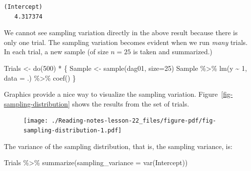 \documentclass[
  letterpaper,
  DIV=11,
  numbers=noendperiod,
  oneside]{scrreprt}
\newenvironment{Shaded}{\begin{snugshade}}{\end{snugshade}}
\newcommand{\AttributeTok}[1]{\textcolor[rgb]{0.40,0.45,0.13}{#1}}
\newcommand{\DecValTok}[1]{\textcolor[rgb]{0.68,0.00,0.00}{#1}}
\newcommand{\FunctionTok}[1]{\textcolor[rgb]{0.28,0.35,0.67}{#1}}
\newcommand{\NormalTok}[1]{\textcolor[rgb]{0.00,0.23,0.31}{#1}}
\newcommand{\OtherTok}[1]{\textcolor[rgb]{0.00,0.23,0.31}{#1}}
\newcommand{\SpecialCharTok}[1]{\textcolor[rgb]{0.37,0.37,0.37}{#1}}
\begin{document}
\begin{verbatim}
(Intercept) 
   4.317374 
\end{verbatim}

We cannot see sampling variation directly in the above result because
there is only one trial. The sampling variation becomes evident when we
run \emph{many} trials. In each trial, a new sample (of size \(n=25\) is
taken and summarized.)

\begin{Shaded}
\begin{Highlighting}[]
\NormalTok{Trials }\OtherTok{\textless{}{-}} \FunctionTok{do}\NormalTok{(}\DecValTok{500}\NormalTok{) }\SpecialCharTok{*}\NormalTok{ \{}
\NormalTok{  Sample }\OtherTok{\textless{}{-}} \FunctionTok{sample}\NormalTok{(dag01, }\AttributeTok{size=}\DecValTok{25}\NormalTok{) }
\NormalTok{  Sample }\SpecialCharTok{\%\textgreater{}\%} 
    \FunctionTok{lm}\NormalTok{(y }\SpecialCharTok{\textasciitilde{}} \DecValTok{1}\NormalTok{, }\AttributeTok{data =}\NormalTok{ .) }\SpecialCharTok{\%\textgreater{}\%}
    \FunctionTok{coef}\NormalTok{()}
\NormalTok{\}}
\end{Highlighting}
\end{Shaded}

Graphics provide a nice way to visualize the sampling variation.
Figure~\ref{fig-sampling-distribution} shows the results from the set of
trials.

\begin{figure}


{\centering \texttt{[image: ./Reading-notes-lesson-22\_files/figure-pdf/fig-sampling-distribution-1.pdf]}

}

\end{figure}

The variance of the sampling distribution, that is, the sampling
variance, is:

\begin{Shaded}
\begin{Highlighting}[]
\NormalTok{Trials }\SpecialCharTok{\%\textgreater{}\%}
  \FunctionTok{summarize}\NormalTok{(}\AttributeTok{sampling\_variance =} \FunctionTok{var}\NormalTok{(Intercept))}
\end{Highlighting}
\end{Shaded}
\end{document}

